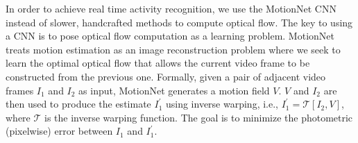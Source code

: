 \documentclass[sigconf]{acmart}
\begin{document}
	In order to achieve real time activity recognition, we use the MotionNet \cite{hidden_zhu_17} CNN instead of slower, handcrafted methods to compute optical flow. The key to using a CNN is to pose optical flow computation as a learning problem. MotionNet treats motion estimation as an image reconstruction problem \cite{jasonUnsup2016,guided_flow_17,densenet_denseflow_icip17} where we seek to learn the optimal optical flow that allows the current video frame to be constructed from the previous one. Formally, given a pair of adjacent video frames $I_{1}$ and $I_{2}$ as input, MotionNet generates a motion field $V$. $V$ and $I_{2}$ are then used to produce the estimate $I_{1}^{\prime}$ using inverse warping, i.e., $I_{1}^{\prime} = \mathcal{T}[I_{2}, V]$, where $\mathcal{T}$ is the inverse warping function. The goal is to minimize the photometric (pixelwise) error between $I_{1}$ and $I_{1}^{\prime}$. 
	
\end{document}
